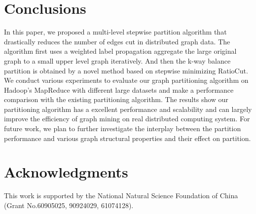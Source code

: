 \documentclass{acm_proc_article-sp}
\begin{document}
\section{Conclusions}
In this paper, we proposed a multi-level stepwise partition algorithm that drastically reduces the number of edges cut in distributed graph data. The algorithm first uses a weighted label propagation aggregate the large original graph to a small upper level graph iteratively. And then the k-way balance partition is obtained by a novel method based on stepwise minimizing RatioCut. We conduct various experiments to evaluate our graph partitioning algorithm on Hadoop's MapReduce with different large datasets and make a performance comparison with the existing partitioning algorithm. The results show our partitioning algorithm has a excellent performance and scalability and can largely improve the efficiency of graph mining on real distributed computing system. For future work, we plan to further investigate the interplay between the partition performance and various graph structural properties and their effect on partition.

\section{Acknowledgments}
This work is supported by the National Natural Science Foundation of China (Grant No.60905025, 90924029, 61074128).

%

%
%
\balancecolumns
\end{document}
